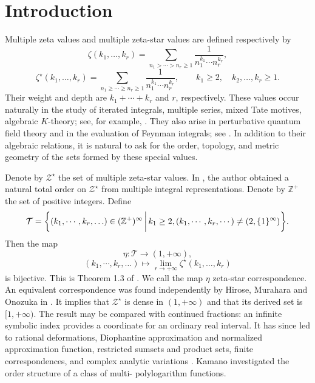 \documentclass[12pt,a4paper]{amsart}
\numberwithin{equation}{section}
\theoremstyle{plain}
\theoremstyle{definition}
\begin{document}
\maketitle

\section{Introduction}\label{int}
Multiple zeta values and multiple zeta-star values are defined respectively by
\[
\zeta(k_1,\ldots,k_r)=\sum_{n_1>\cdots>n_r\geq 1}
\frac{1}{n_1^{k_1}\cdots n_r^{k_r}},
\]
\[
\zeta^{\star}(k_1,\ldots,k_r)=\sum_{n_1\geq\cdots\geq n_r\geq 1}
\frac{1}{n_1^{k_1}\cdots n_r^{k_r}},
\qquad k_1\geq 2,\quad k_2,\ldots,k_r\geq 1.
\]
Their weight and depth are $k_1+\cdots+k_r$ and $r$, respectively.  These values occur naturally in the study of iterated integrals, multiple series, mixed Tate motives, algebraic $K$-theory; see, for example, \cite{gonc,chen,DG,brow,ganl,gon1,gon2,ikz,zag}.   They also arise in perturbative quantum field theory and in the evaluation of Feynman integrals; see \cite{bro1,duhr,pan}.
 In addition to their algebraic relations, it is natural to ask for the order, topology, and metric geometry of the sets formed by these special values.

Denote by $\mathcal{Z}^{\star}$ the set of multiple zeta-star values.  In \cite{lit}, the author obtained a natural total order on $\mathcal{Z}^{\star}$ from multiple integral representations. Denote by $\mathbb{Z}^+$ the set of positive integers. Define
\[
\mathcal{T}=\bigg{\{}(k_1,\cdots, k_r,\ldots)\in (\mathbb{Z}^+)^{\infty}\,\bigg{|}\,
k_1\geq 2, (k_1,\cdots,k_r,\cdots)\neq (2,\{1\}^{\infty})\bigg{\}}.
\]
Then the map
\[
\eta:\mathcal{T}\rightarrow(1,+\infty),
\]
\[
(k_1,\cdots,k_r,\ldots)\mapsto
\lim_{r\rightarrow+\infty}\zeta^{\star}(k_1,\ldots,k_r)
\]
is bijective.  This is Theorem 1.3 of \cite{lit}. We call the map $\eta$ zeta-star correspondence. An equivalent correspondence was found independently by Hirose, Murahara and Onozuka in \cite{hmo}.  It implies that $\mathcal{Z}^{\star}$ is dense in $(1,+\infty)$ and that its derived set is $[1,+\infty)$.  The result may be compared with continued fractions: an infinite symbolic index provides a coordinate for an ordinary real interval.  It has since led to rational deformations, Diophantine approximation and normalized approximation function,
restricted sumsets and product sets, finite correspondences, and complex
analytic variations
\cite{LiRational2025,Li2025,LiYang2026,LiDivided2026,Li2026}. Kamano \cite{Kamano2026} investigated the order structure of  a class of multi- polylogarithm functions.
\end{document}
